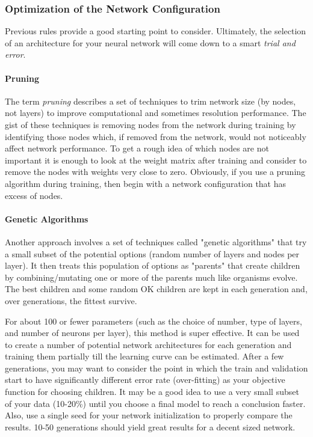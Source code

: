 \subsubsection*{Optimization of the Network Configuration}

Previous rules provide a good starting point to consider. Ultimately, the selection of an architecture for your neural network will come down to a smart \emph{trial and error}. 

\paragraph{Pruning}
The term \emph{pruning} describes a set of techniques to trim network size (by nodes, not layers) to improve computational and sometimes resolution performance. 
The gist of these techniques is removing nodes from the network during training by identifying those nodes which, if removed from the network, would not noticeably affect network performance. To get a rough idea of which nodes are not important it is enough to look at the weight matrix after training and consider to remove the nodes with weights very close to zero. 
Obviously, if you use a pruning algorithm during training, then begin with a network configuration that has excess of nodes.

\paragraph{Genetic Algorithms}

Another approach involves a set of techniques called "genetic algorithms" that try a small subset of the potential options (random number of layers and nodes per layer). It then treats this population of options as "parents" that create children by combining/mutating one or more of the parents much like organisms evolve. The best children and some random OK children are kept in each generation and, over generations, the fittest survive.

For about 100 or fewer parameters (such as the choice of number, type of layers, and number of neurons per layer), this method is super effective. It can be used to create a number of potential network architectures for each generation and training them partially till the learning curve can be estimated. After a few generations, you may want to consider the point in which the train and validation start to have significantly different error rate (over-fitting) as your objective function for choosing children. It may be a good idea to use a very small subset of your data (10-20\%) until you choose a final model to reach a conclusion faster. Also, use a single seed for your network initialization to properly compare the results. 10-50 generations should yield great results for a decent sized network.

